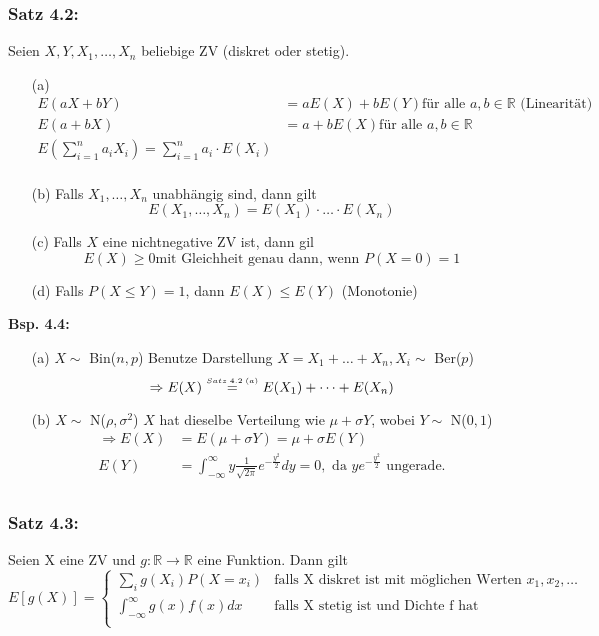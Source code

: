 \documentclass[a4paper,11pt]{article}
\newcommand\sfotwoa{\overset{\mathclap{\scriptscriptstyle Satz \hspace{2pt} 4.2 \hspace{2pt} (a)}}{=}}
\begin{document}
\subsubsection{Satz 4.2:}
Seien $X,Y,X_1,\dots,X_n$ beliebige ZV (diskret oder stetig).
\begin{itemize}
    \item[(a)]
        \begin{align*}
        E(aX+bY) &= aE(X)+bE(Y) \text{für alle $a,b\in\mathbb{R}$ (Linearität)}\\
        E(a+bX) &= a+bE(X) \text{für alle $a,b\in\mathbb{R}$}\\
        E(\sum_{i=1}^{n}a_iX_i)=\sum_{i=1}^{n}a_i\cdot E(X_i)\\
        \end{align*}
    \item[(b)] Falls $X_1,\dots,X_n$ unabhängig sind, dann gilt
        \[E(X_1,\dots,X_n)=E(X_1)\cdot\dots\cdot E(X_n)\]
    \item[(c)] Falls $X$ eine nichtnegative ZV ist, dann gil
        \[E(X)\geq0 \text{mit Gleichheit genau dann, wenn } P(X=0)=1\]
    \item[(d)] Falls $P(X\leq Y)=1$, dann $E(X)\leq E(Y)$ (Monotonie)
\end{itemize}

\vspace{6pt}
\noindent\textbf{Bsp. 4.4:}
\begin{itemize}
\item[(a)]$X\sim$ Bin($n,p$)
\newline Benutze Darstellung $X=X_1+\dots+X_n, X_i\sim$ Ber($p$)
\[\Rightarrow E(X) \hspace{15pt} \sfotwoa \hspace{15pt} E(X_1)+\dots+E(X_n)\]
\item[(b)] $X\sim$ N($\rho,\sigma^2$)
\newline $X$ hat dieselbe Verteilung wie $\mu + \sigma Y$, wobei $Y\sim$ N($0,1$)
\begin{align*}
\Rightarrow E(X) &= E(\mu + \sigma Y) = \mu + \sigma E(Y)\\
E(Y) &= \int_{-\infty}^{\infty}y\frac{1}{\sqrt{2\pi}}e^{-\frac{y^2}{2}}dy=0, \text{ da } ye^{-\frac{y^2}{2}} \text{ ungerade.}\\
\end{align*}
\end{itemize}

\subsubsection{Satz 4.3:} Seien X eine ZV und $g:\mathbb{R}\rightarrow\mathbb{R}$ eine Funktion. Dann gilt
\begin{equation*}
E[g(X)] = \begin{cases}
\sum_{i}^{}g(X_i)P(X=x_i) & \text{falls X diskret ist mit möglichen Werten  } x_1,x_2,\dots\\
\int_{-\infty}^{\infty}g(x)f(x)dx & \text{falls X stetig ist und Dichte f hat}\\
\end{cases}
\end{equation*}
\end{document}
